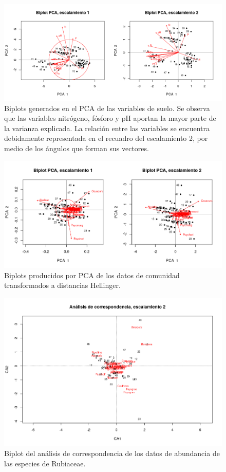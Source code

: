 \documentclass[11pt,]{article}
\begin{document}
\begin{figure}
\centering
\includegraphics{pca_biplot_suelo.png}
\caption{Biplots generados en el PCA de las variables de suelo. Se
observa que las variables nitrógeno, fósforo y pH aportan la mayor parte
de la varianza explicada. La relación entre las variables se encuentra
debidamente representada en el recuadro del escalamiento 2, por medio de
los ángulos que forman sus vectores. \label{fig:pca_biplot_suelo}}
\end{figure}

\begin{figure}
\centering
\includegraphics{pca_biplot_sps.png}
\caption{Biplots producidos por PCA de los datos de comunidad
transformados a distancias Hellinger. \label{fig:pca_biplot_sps}}
\end{figure}

\begin{figure}
\centering
\includegraphics[height=0.65000\textwidth]{biplot_correspndncia_sps_escal_2_2.png}
\caption{Biplot del análisis de correspondencia de los datos de
abundancia de las especies de Rubiaceae.
\label{fig:biplot_correspndncia_sps_escal_2_2}}
\end{figure}
\end{document}
